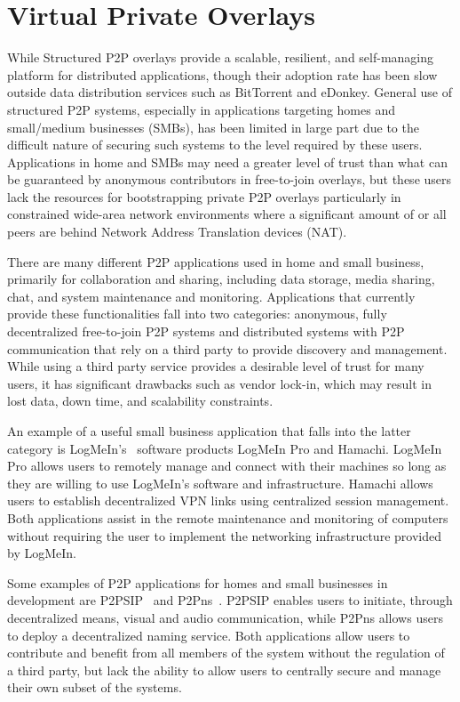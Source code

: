 \chapter{Virtual Private Overlays}
\label{vpo}
While Structured P2P overlays provide a scalable, resilient, and self-managing
platform for distributed applications, though their adoption rate has been slow
outside data distribution services such as BitTorrent and eDonkey.  General use
of structured P2P systems, especially in applications targeting homes and
small/medium businesses (SMBs), has been limited in large part due to the
difficult nature of securing such systems to the level required by these users.
Applications in home and SMBs may need a greater level of trust than what can
be guaranteed by anonymous contributors in free-to-join overlays, but these
users lack the resources for bootstrapping private P2P overlays particularly in
constrained wide-area network environments where a significant amount of or all
peers are behind Network Address Translation devices (NAT).

There are many different P2P applications used in home and small business,
primarily for collaboration and sharing, including data storage, media sharing,
chat, and system maintenance and monitoring.  Applications that currently
provide these functionalities fall into two categories:  anonymous, fully
decentralized free-to-join P2P systems and distributed systems with P2P
communication that rely on a third party to provide discovery and management.
While using a third party service provides a desirable level of trust for many
users, it has significant drawbacks such as vendor lock-in, which may result in
lost data, down time, and scalability constraints.

An example of a useful small business application that falls into the latter
category is LogMeIn's~\cite{logmein} software products LogMeIn Pro and Hamachi.
LogMeIn Pro allows users to remotely manage and connect with their machines so
long as they are willing to use LogMeIn's software and infrastructure.  Hamachi
allows users to establish decentralized VPN links using centralized session
management.  Both applications assist in the remote maintenance and monitoring
of computers without requiring the user to implement the networking
infrastructure provided by LogMeIn.

Some examples of P2P applications for homes and small businesses in development
are P2PSIP~\cite{p2psip} and P2Pns~\cite{p2pns}.  P2PSIP enables users to
initiate, through decentralized means, visual and audio communication, while
P2Pns allows users to deploy a decentralized naming service.  Both applications
allow users to contribute and benefit from all members of the system without
the regulation of a third party, but lack the ability to allow users to
centrally secure and manage their own subset of the systems.

